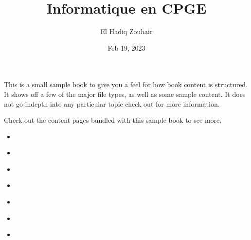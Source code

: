 \documentclass[letterpaper,10pt,english]{jupyterBook}
\title{Informatique en CPGE}
\date{Feb 19, 2023}
\author{El Hadiq Zouhair}
\begin{document}
\pagestyle{empty}
\sphinxmaketitle
\pagestyle{plain}
\sphinxtableofcontents
\pagestyle{normal}
\label{\detokenize{intro::doc}}


\sphinxAtStartPar
This is a small sample book to give you a feel for how book content is
structured.
It shows off a few of the major file types, as well as some sample content.
It does not go in\sphinxhyphen{}depth into any particular topic \sphinxhyphen{} check out  for more information.

\sphinxAtStartPar
Check out the content pages bundled with this sample book to see more.

\begin{DUlineblock}{0em}
\item[] 
\end{DUlineblock}
\begin{itemize}
\item {} 
\sphinxAtStartPar
{\hyperref[\detokenize{notebooks/Arbres-binaires/Arbres::doc}]{}}

\item {} 
\sphinxAtStartPar
{\hyperref[\detokenize{notebooks/ABR/ABR::doc}]{}}

\item {} 
\sphinxAtStartPar
{\hyperref[\detokenize{notebooks/dynamicProgramming/ProgrammationDynamique::doc}]{}}

\item {} 
\sphinxAtStartPar
{\hyperref[\detokenize{notebooks/dynamicProgramming/glouton::doc}]{}}

\item {} 
\sphinxAtStartPar
{\hyperref[\detokenize{notebooks/images/TRAITEMENT-DES-IMAGES::doc}]{}}

\item {} 
\sphinxAtStartPar
{\hyperref[\detokenize{notebooks/Machine-Learning/KNN-Cours::doc}]{}}

\item {} 
\sphinxAtStartPar
{\hyperref[\detokenize{notebooks/Machine-Learning/TP-Iris::doc}]{}}

\end{itemize}

\begin{DUlineblock}{0em}
\item[] 
\end{DUlineblock}
\end{document}
